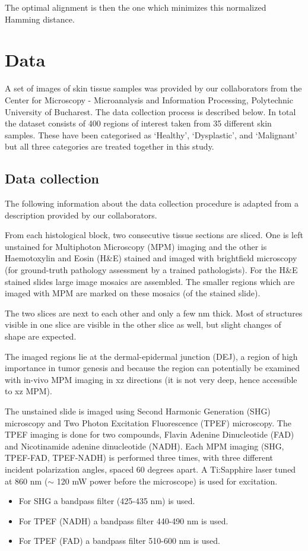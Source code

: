\documentclass{report}
\begin{document}
The optimal alignment is then the one which minimizes this normalized Hamming distance.


\chapter{Data}
\label{sec:data}

A set of images of skin tissue samples was provided by our collaborators from the Center for Microscopy - Microanalysis and Information Processing, Polytechnic University of Bucharest. The data collection process is described below. In total the dataset consists of 400 regions of interest taken from 35 different skin samples. These have been categorised as `Healthy', `Dysplastic', and `Malignant' but all three categories are treated together in this study.

\section{Data collection}
The following information about the data collection procedure is adapted from a description provided by our collaborators.

From each histological block, two consecutive tissue sections are sliced. One is left unstained for Multiphoton Microscopy (MPM) imaging and the other is Haemotoxylin and Eosin (H\&E) stained and imaged with brightfield microscopy (for ground-truth pathology assessment by a trained pathologists). For the H\&E stained slides large image mosaics are assembled. The smaller regions which are imaged with MPM are marked on these mosaics (of the stained slide).  

The two slices are next to each other and only a few nm thick. Most of structures visible in one slice are visible in the other slice as well, but slight changes of shape are expected.

The imaged regions lie at the dermal-epidermal junction (DEJ), a region of high importance in tumor genesis and because the region can potentially be examined with in-vivo MPM imaging in xz directions (it is not very deep, hence accessible to xz MPM).

The unstained slide is imaged using Second Harmonic Generation (SHG) microscopy and Two Photon Excitation Fluorescence (TPEF) microscopy. The TPEF imaging is done for two compounds, Flavin Adenine Dinucleotide (FAD) and Nicotinamide adenine dinucleotide (NADH). Each MPM imaging (SHG, TPEF-FAD, TPEF-NADH) is performed three times, with three different incident polarization angles, spaced 60 degrees apart. A Ti:Sapphire laser tuned at 860 nm ($\sim$ 120 mW power before the microscope) is used for excitation. 
\begin{itemize}
\item For SHG a bandpass filter (425-435 nm) is used.
\item For TPEF (NADH) a bandpass filter 440-490 nm is used.
\item For TPEF (FAD) a bandpass filter 510-600 nm is used.
\end{itemize}
\end{document}
